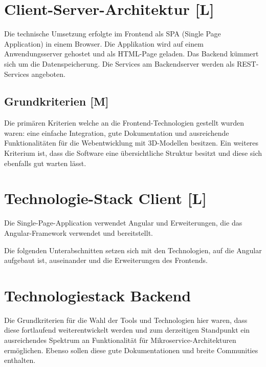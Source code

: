 \section{Client-Server-Architektur [L]}
Die technische Umsetzung erfolgte im Frontend als SPA (Single Page Application) in einem Browser. Die Applikation wird auf einem Anwendungsserver gehostet und als HTML-Page geladen. Das Backend kümmert sich um die Datenspeicherung. Die Services am Backendserver werden als REST-Services angeboten.

\subsection{Grundkriterien [M]} 
Die primären Kriterien welche an die Frontend-Technologien gestellt wurden waren: eine einfache Integration, gute Dokumentation und ausreichende Funktionalitäten für die Webentwicklung mit 3D-Modellen besitzen. Ein weiteres Kriterium ist, dass die Software eine übersichtliche Struktur besitzt und diese sich ebenfalls gut warten lässt. 

  

\section{Technologie-Stack Client [L]}
Die Single-Page-Application verwendet Angular und Erweiterungen, die das Angular-Framework verwendet und bereitstellt.

Die folgenden Unterabschnitten setzen sich mit den Technologien, auf die Angular aufgebaut ist, auseinander und die Erweiterungen des Frontends.





\section{Technologiestack Backend}
Die Grundkriterien für die Wahl der Tools und Technologien hier waren, dass diese fortlaufend weiterentwickelt werden und zum derzeitigen Standpunkt ein ausreichendes Spektrum an Funktionalität für Mikroservice-Architekturen ermöglichen.\cite{MicroserviceAbout} Ebenso sollen diese gute Dokumentationen und breite Communities enthalten. 



